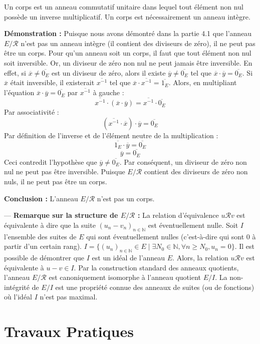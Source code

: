 \documentclass{report}
\begin{document}
Un corps est un anneau commutatif unitaire dans lequel tout élément non nul possède un inverse multiplicatif. Un corps est nécessairement un anneau intègre.

\textbf{Démonstration :}
Puisque nous avons démontré dans la partie 4.1 que l'anneau $E/\mathcal{R}$ n'est pas un anneau intègre (il contient des diviseurs de zéro), il ne peut pas être un corps.
Pour qu'un anneau soit un corps, il faut que tout élément non nul soit inversible. Or, un diviseur de zéro non nul ne peut jamais être inversible.
En effet, si $\overline{x} \neq \overline{0_E}$ est un diviseur de zéro, alors il existe $\overline{y} \neq \overline{0_E}$ tel que $\overline{x} \cdot \overline{y} = \overline{0_E}$.
Si $\overline{x}$ était inversible, il existerait $\overline{x^{-1}}$ tel que $\overline{x} \cdot \overline{x^{-1}} = \overline{1_E}$.
Alors, en multipliant l'équation $\overline{x} \cdot \overline{y} = \overline{0_E}$ par $\overline{x^{-1}}$ à gauche :
$$\overline{x^{-1}} \cdot (\overline{x} \cdot \overline{y}) = \overline{x^{-1}} \cdot \overline{0_E}$$
Par associativité :
$$(\overline{x^{-1}} \cdot \overline{x}) \cdot \overline{y} = \overline{0_E}$$
Par définition de l'inverse et de l'élément neutre de la multiplication :
$$\overline{1_E} \cdot \overline{y} = \overline{0_E}$$
$$\overline{y} = \overline{0_E}$$
Ceci contredit l'hypothèse que $\overline{y} \neq \overline{0_E}$.
Par conséquent, un diviseur de zéro non nul ne peut pas être inversible.
Puisque $E/\mathcal{R}$ contient des diviseurs de zéro non nuls, il ne peut pas être un corps.

\textbf{Conclusion :} L'anneau $E/\mathcal{R}$ n'est pas un corps.

---
\textbf{Remarque sur la structure de $E/\mathcal{R}$ :}
La relation d'équivalence $u \mathcal{R} v$ est équivalente à dire que la suite $(u_n - v_n)_{n \in \mathbb{N}}$ est éventuellement nulle.
Soit $I$ l'ensemble des suites de $E$ qui sont éventuellement nulles (c'est-à-dire qui sont $0$ à partir d'un certain rang).
$I = \{ (u_n)_{n \in \mathbb{N}} \in E \mid \exists N_0 \in \mathbb{N}, \forall n \ge N_0, u_n = 0 \}$.
Il est possible de démontrer que $I$ est un idéal de l'anneau $E$.
Alors, la relation $u \mathcal{R} v$ est équivalente à $u - v \in I$.
Par la construction standard des anneaux quotients, l'anneau $E/\mathcal{R}$ est canoniquement isomorphe à l'anneau quotient $E/I$.
La non-intégrité de $E/I$ est une propriété connue des anneaux de suites (ou de fonctions) où l'idéal $I$ n'est pas maximal.
\newpage
\chapter*{Travaux Pratiques}
\end{document}
